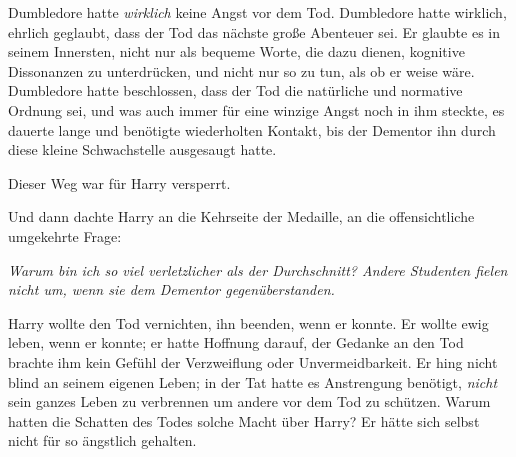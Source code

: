 Dumbledore hatte \emph{wirklich} keine Angst vor dem Tod. Dumbledore hatte wirklich, ehrlich geglaubt, dass der Tod das nächste große Abenteuer sei. Er glaubte es in seinem Innersten, nicht nur als bequeme Worte, die dazu dienen, kognitive Dissonanzen zu unterdrücken, und nicht nur so zu tun, als ob er weise wäre. Dumbledore hatte beschlossen, dass der Tod die natürliche und normative Ordnung sei, und was auch immer für eine winzige Angst noch in ihm steckte, es dauerte lange und benötigte wiederholten Kontakt, bis der Dementor ihn durch diese kleine Schwachstelle ausgesaugt hatte.

Dieser Weg war für Harry versperrt.

Und dann dachte Harry an die Kehrseite der Medaille, an die offensichtliche umgekehrte Frage:

\emph{Warum bin ich so viel verletzlicher als der Durchschnitt? Andere Studenten fielen nicht um, wenn sie dem Dementor gegenüberstanden.}

Harry wollte den Tod vernichten, ihn beenden, wenn er konnte. Er wollte ewig leben, wenn er konnte; er hatte Hoffnung darauf, der Gedanke an den Tod brachte ihm kein Gefühl der Verzweiflung oder Unvermeidbarkeit. Er hing nicht blind an seinem eigenen Leben; in der Tat hatte es Anstrengung benötigt, \emph{nicht} sein ganzes Leben zu verbrennen um andere vor dem Tod zu schützen. Warum hatten die Schatten des Todes solche Macht über Harry? Er hätte sich selbst nicht für so ängstlich gehalten.

